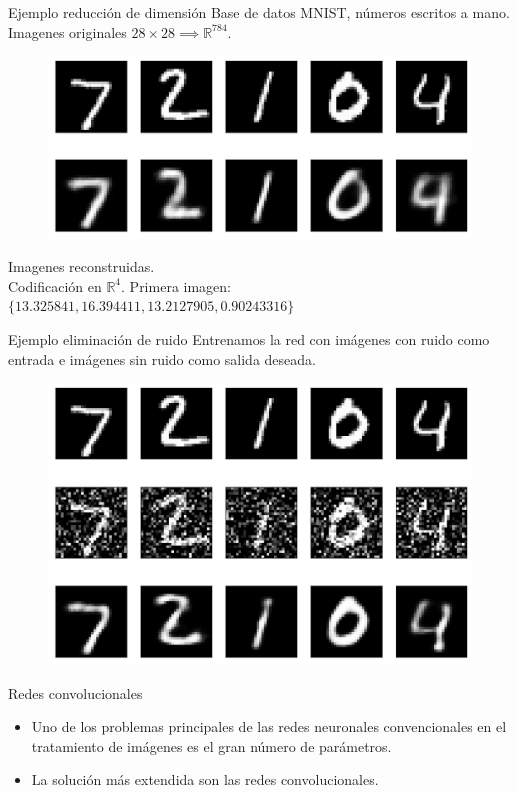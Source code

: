 \documentclass[spanish]{beamer}
\begin{document}
\begin{frame}{Ejemplo reducción de dimensión}
    Base de datos MNIST, números escritos a mano.\\
  Imagenes originales $28\times28 \implies \mathbb{R}^{784}$.
\begin{figure}[h]
  \includegraphics[width=.6\textwidth]{img/autoencoder_ex1}
\end{figure}
Imagenes reconstruidas.\\

Codificación en $\mathbb{R}^4$. Primera imagen: $\{13.325841, 16.394411, 13.2127905, 0.90243316\}$
\end{frame}

\begin{frame}{Ejemplo eliminación de ruido}
Entrenamos la red con imágenes con ruido como entrada e imágenes sin ruido como
salida deseada.
\begin{figure}[h]
  \includegraphics[width=.6\textwidth]{img/autoencoder_ex2}
\end{figure}
\end{frame}

\begin{frame}{Redes convolucionales}
    \begin{itemize}
        \item Uno de los problemas principales de las redes neuronales convencionales en el tratamiento de imágenes es el gran número de parámetros.
        \item La solución más extendida son las redes convolucionales.
    \end{itemize}
\end{frame}
\end{document}
